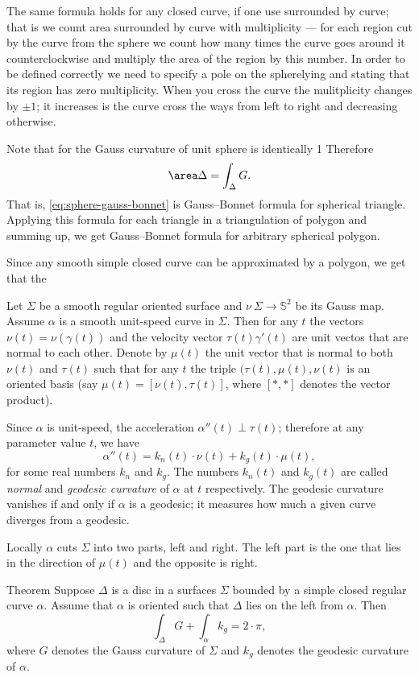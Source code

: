 The same formula holds for any closed curve, if one use  surrounded by curve;
that is we count area surrounded by curve with multiplicity --- for each region cut by the curve from the sphere we count how many times the curve goes around it counterclockwise and multiply the area of the region by this number.
In order to be defined correctly we need to specify a pole on the spherelying and stating that its region has zero multiplicity. 
When you cross the curve the mulitplicity changes by $\pm1$; it increases is the curve cross the ways from left to right and decreasing otherwise.

Note that for the Gauss curvature of unit sphere is identically 1
Therefore 
\[\area\Delta=\int_\Delta G.\]
That is, \ref{eq:sphere-gauss-bonnet} is Gauss--Bonnet formula for spherical triangle.
Applying this formula for each triangle in a  triangulation of polygon and summing up, we get Gauss--Bonnet formula for arbitrary spherical polygon.

Since any smooth simple closed curve can be approximated by a polygon, we get that the 





Let $\Sigma$ be a smooth regular oriented surface and $\nu\:\Sigma\to \mathbb{S}^2$ be its Gauss map.
Assume $\alpha$ is a smooth unit-speed curve in $\Sigma$. 
Then for any $t$ the vectors $\nu(t)=\nu(\gamma(t))$ and the velocity vector $\tau(t)\gamma'(t)$ are unit vectos that are normal to each other.
Denote by $\mu(t)$ the unit vector that is normal to both $\nu(t)$ and $\tau(t)$ such that for any $t$ the triple $(\tau(t),\mu(t),\nu(t)$ is an oriented basis (say $\mu(t)=[\nu(t),\tau(t)]$, where $[{*},{*}]$ denotes the vector product).

Since $\alpha$ is unit-speed, the acceleration $\alpha''(t)\perp\tau(t)$;
therefore at any parameter value $t$, we have
\[\alpha''(t)=k_n(t)\cdot \nu(t)+k_g(t)\cdot \mu(t),\]
for some real numbers $k_n$ and $k_g$.
The numbers $k_n(t)$ and $k_g(t)$ are called \emph{normal} and \emph{geodesic curvature} of $\alpha$ at $t$ respectively.
The geodesic curvature vanishes if and only if $\alpha$ is a geodesic; 
it measures how much a given curve diverges from a geodesic.

Locally $\alpha$ cuts $\Sigma$ into two parts, left and right.
The left part is the one that lies in the direction of $\mu(t)$ and the opposite is right.


\begin{thm}{Theorem}
Suppose $\Delta$ is a disc in a surfaces $\Sigma$ 
bounded by a simple closed regular curve $\alpha$.
Assume that $\alpha$ is oriented such that $\Delta$ lies on the left from $\alpha$.
Then
\[\int_\Delta G+\int_\alpha k_g=2\cdot \pi,\]
where $G$ denotes the Gauss curvature of $\Sigma$ and
$k_g$ denotes the geodesic curvature of $\alpha$.

\end{thm}


